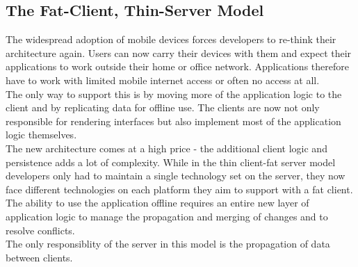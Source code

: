 \subsection{The Fat-Client, Thin-Server Model}
The widespread adoption of mobile devices forces developers to re-think their architecture again. Users can now carry their devices with them and expect their applications to work outside their home or office network.
Applications therefore have to work with limited mobile internet access or often no access at all.\\
The only way to support this is by moving more of the application logic to the client and by replicating data for offline use. The clients are now not only responsible for rendering interfaces but also implement most of the application logic themselves.\\
The new architecture comes at a high price - the additional client logic and persistence adds a lot of complexity. While in the thin client-fat server model developers only had to maintain a single technology set on the server, they now face different technologies on each platform they aim to support with a fat client.\\
The ability to use the application offline requires an entire new layer of application logic to manage the propagation and merging of changes and to resolve conflicts.\\
The only responsiblity of the server in this model is the propagation of data between clients.

